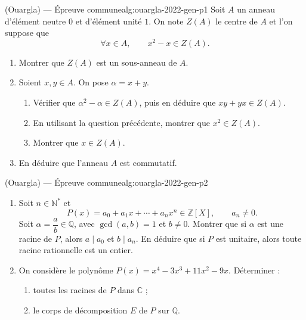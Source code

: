 \newpage

\begin{problem}{(Ouargla) — Épreuve commune}{alg:ouargla-2022-gen-p1}
Soit $A$ un anneau d'élément neutre $0$ et d'élément unité $1$. On note $Z(A)$ le
centre de $A$ et l'on suppose que
$$
\forall x\in A,\qquad x^2-x\in Z(A).
$$
\begin{enumerate}
\item Montrer que $Z(A)$ est un sous-anneau de $A$.
\item Soient $x,y\in A$. On pose $\alpha=x+y$.
      \begin{enumerate}
      \item Vérifier que $\alpha^2-\alpha\in Z(A)$, puis en déduire que
            $xy+yx\in Z(A)$.
      \item En utilisant la question précédente, montrer que $x^2\in Z(A)$.
      \item Montrer que $x\in Z(A)$.
      \end{enumerate}
\item En déduire que l'anneau $A$ est commutatif.
\end{enumerate}

\end{problem}

\newpage

\begin{problem}{(Ouargla) — Épreuve commune}{alg:ouargla-2022-gen-p2}
\begin{enumerate}
\item Soit $n\in\mathbb{N}^*$ et
      $$
      P(x)=a_0+a_1x+\cdots+a_nx^n\in\mathbb{Z}[X],\qquad a_n\neq0.
      $$
      Soit $\alpha=\dfrac{a}{b}\in\mathbb{Q}$, avec $\gcd(a,b)=1$ et $b\neq0$.
      Montrer que si $\alpha$ est une racine de $P$, alors $a\mid a_0$ et
      $b\mid a_n$. En déduire que si $P$ est unitaire, alors toute racine
      rationnelle est un entier.
\item On considère le polynôme $P(x)=x^4-3x^3+11x^2-9x$. Déterminer :
      \begin{enumerate}
      \item toutes les racines de $P$ dans $\mathbb{C}$ ;
      \item le corps de décomposition $E$ de $P$ sur $\mathbb{Q}$.
      \end{enumerate}
\end{enumerate}

\end{problem}

